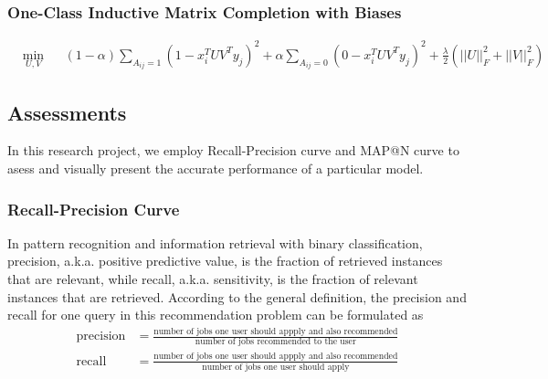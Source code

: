 \documentclass{article} %
\begin{document}
\subsubsection{One-Class Inductive Matrix Completion with Biases}
\begin{equation}
    \begin{aligned}
        &\min_{U,V} &&(1-\alpha) \sum_{A_{ij}=1} (1 - x_i^TUV^Ty_j)^2 +
        \alpha \sum_{A_{ij}=0} (0 - x_i^TUV^Ty_j)^2 + \frac{\lambda}{2}(||U||_F^2 + ||V||_F^2)
    \end{aligned}
\end{equation}

% 
\subsection{Assessments}
In this research project, we employ Recall-Precision curve and MAP@N curve to 
asess and visually present the accurate performance of a particular model. 
\subsubsection{Recall-Precision Curve}
In pattern recognition and information retrieval with binary classification,
precision, a.k.a. positive predictive value, is the fraction of retrieved
instances that are relevant, while recall, a.k.a. sensitivity, is the
fraction of relevant instances that are retrieved. According to the general
definition, the precision and recall for one query in this recommendation problem can be
formulated as 
\begin{align}
    \text{precision} &=  \frac{\text{number of jobs one user should appply and also
            recommended}}{\text{number of jobs recommended to the user}} \\
    \text{recall} &= \frac{\text{number of jobs one user should appply and
            also recommended}}{\text{number of jobs one user should apply}}
\end{align}
\end{document}
